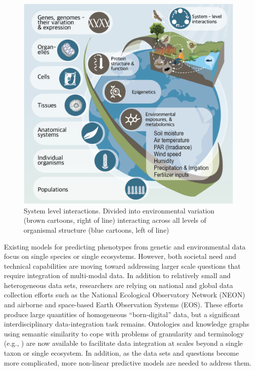 \documentclass[11pt,]{article}
\begin{document}
\begin{figure}
\centering
\includegraphics{Figure1.png}
\caption{System level interactions. Divided into environmental variation
(brown cartoons, right of line) interacting across all levels of
organismal structure (blue cartoons, left of line)}
\end{figure}

Existing models for predicting phenotypes from genetic and environmental
data focus on single species or single ecosystems. However, both
societal need and technical capabilities are moving toward addressing
larger scale questions that require integration of multi-modal data. In
addition to relatively small and heterogeneous data sets, researchers
are relying on national and global data collection efforts
\citep{balch2020neon} such as the National Ecological Observatory
Network (NEON) \citep{keller2008continental} and airborne and
space-based Earth Observation Systems (EOS). These efforts produce large
quantities of homogeneous ``born-digital'' data, but a significant
interdisciplinary data-integration task remains. Ontologies and
knowledge graphs using semantic similarity to cope with problems of
granularity and terminology (e.g.,
\citep{mungallintegrating2010, stuckyplant2018}) are now available to
facilitate data integration at scales beyond a single taxon or single
ecosystem. In addition, as the data sets and questions become more
complicated, more non-linear predictive models are needed to address
them.
\end{document}

